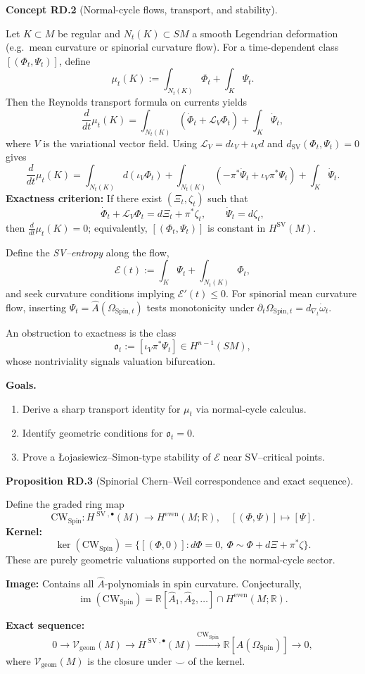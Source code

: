 \documentclass[10pt, letterpaper]{article}
\newcommand{\R}{\mathbb{R}}
\newcommand{\Spin}{\mathrm{Spin}}
\newcommand{\CustomHeading}[3]{%
  \par\medskip\noindent%
  \textbf{#1 #2} \textnormal{(#3)}.\enskip%
}
\newenvironment{PROP}[2]{\begin{unitbox}\CustomHeading{Proposition}{#1}{#2}}{\end{unitbox}}
\newenvironment{CONC}[2]{\begin{unitbox}\CustomHeading{Concept}{#1}{#2}}{\end{unitbox}}
\begin{document}
\begin{CONC}{RD.2}{Normal-cycle flows, transport, and stability}
Let $K\subset M$ be regular and $N_t(K)\subset SM$ a smooth Legendrian deformation (e.g.\ mean curvature or spinorial curvature flow).
For a time-dependent class $[(\Phi_t,\Psi_t)]$, define
\[
\mu_t(K):=\int_{N_t(K)}\Phi_t+\int_K\Psi_t.
\]
Then the Reynolds transport formula on currents yields
\[
\frac{d}{dt}\mu_t(K)
=\int_{N_t(K)}(\dot\Phi_t+\mathcal L_V\Phi_t)+\int_K\dot\Psi_t,
\]
where $V$ is the variational vector field.
Using $\mathcal L_V=d\iota_V+\iota_V d$ and $d_{\operatorname{SV}}(\Phi_t,\Psi_t)=0$ gives
\[
\frac{d}{dt}\mu_t(K)
=\int_{N_t(K)}d(\iota_V\Phi_t)
+\int_{N_t(K)}(-\pi^*\dot\Psi_t+\iota_V\pi^*\Psi_t)
+\int_K\dot\Psi_t.
\]
\textbf{Exactness criterion:}
If there exist $(\Xi_t,\zeta_t)$ such that
\[
\dot\Phi_t+\mathcal L_V\Phi_t=d\Xi_t+\pi^*\zeta_t,\qquad
\dot\Psi_t=d\zeta_t,
\]
then $\frac{d}{dt}\mu_t(K)=0$; equivalently, $[(\Phi_t,\Psi_t)]$ is constant in $H^{\operatorname{SV}}(M)$.

\medskip
Define the \emph{SV–entropy} along the flow,
\[
\mathcal E(t):=\int_K\Psi_t+\int_{N_t(K)}\Phi_t,
\]
and seek curvature conditions implying $\mathcal E'(t)\le0$.
For spinorial mean curvature flow, inserting $\Psi_t=\widehat A(\Omega_{\Spin,t})$ tests monotonicity under $\partial_t\Omega_{\Spin,t}=d_{\nabla_t}\dot\omega_t$.

An obstruction to exactness is the class
\[
\mathfrak o_t:=[\iota_V\pi^*\Psi_t]\in H^{n-1}(SM),
\]
whose nontriviality signals valuation bifurcation.

\medskip\noindent\textbf{Goals.}
\begin{enumerate}[label=(\roman*)]
\item Derive a sharp transport identity for $\mu_t$ via normal-cycle calculus.
\item Identify geometric conditions for $\mathfrak o_t=0$.
\item Prove a Łojasiewicz–Simon-type stability of $\mathcal E$ near SV–critical points.
\end{enumerate}
\end{CONC}

\begin{PROP}{RD.3}{Spinorial Chern--Weil correspondence and exact sequence}
Define the graded ring map
\[
\mathrm{CW}_{\Spin}:H^{\operatorname{SV},\bullet}(M)\to H^{\mathrm{even}}(M;\R),
\quad[(\Phi,\Psi)]\mapsto[\Psi].
\]
\textbf{Kernel:}
\[
\ker(\mathrm{CW}_{\Spin})=\{[(\Phi,0)]:d\Phi=0,\ \Phi\sim\Phi+d\Xi+\pi^*\zeta\}.
\]
These are purely geometric valuations supported on the normal-cycle sector.

\textbf{Image:} 
Contains all $\widehat A$-polynomials in spin curvature. Conjecturally,
\[
\operatorname{im}(\mathrm{CW}_{\Spin})=\R[\widehat A_1,\widehat A_2,\ldots]\cap H^{\mathrm{even}}(M;\R).
\]

\textbf{Exact sequence:}
\[
0\to \mathcal V_{\mathrm{geom}}(M)
\to H^{\operatorname{SV},\bullet}(M)
\xrightarrow{\ \mathrm{CW}_{\Spin}\ }
\R[\widehat A(\Omega_{\Spin})]
\to0,
\]
where $\mathcal V_{\mathrm{geom}}(M)$ is the closure under $\smile$ of the kernel.
\end{PROP}
\end{document}
